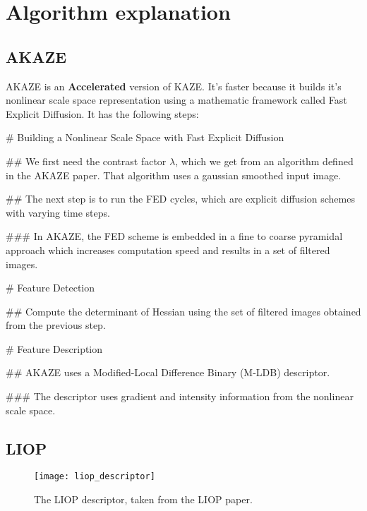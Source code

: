 
\section{Algorithm explanation}

\subsection{AKAZE}

AKAZE is an \textbf{Accelerated} version of KAZE\@. It's faster because it builds
it's nonlinear scale space representation using a mathematic framework called
Fast Explicit Diffusion. It has the following steps:
\begin{easylist}[tractatus]

# Building a Nonlinear Scale Space with Fast Explicit Diffusion

## We first need the contrast factor \(\lambda\), which we get from an
algorithm defined in the AKAZE paper. That algorithm uses a gaussian smoothed
input image.

## The next step is to run the FED cycles, which are explicit diffusion schemes
with varying time steps.

### In AKAZE, the FED scheme is embedded in a fine to coarse pyramidal approach
which increases computation speed and results in a set of filtered images.

# Feature Detection

## Compute the determinant of Hessian using the set of filtered images obtained
from the previous step.

# Feature Description

## AKAZE uses a Modified-Local Difference Binary (M-LDB) descriptor. 

### The descriptor uses gradient and intensity information from the nonlinear
scale space.

\end{easylist}

\subsection{LIOP}

\begin{figure}
  \texttt{[image: liop\_descriptor]}
  \caption{The LIOP descriptor, taken from the LIOP paper.}
\label{fig:liop_descriptor}
\end{figure}

